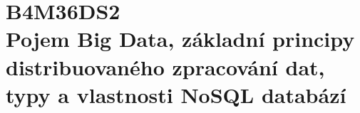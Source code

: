 \chapter[Databáze 2]{B4M36DS2 \\[1ex]\Large{Pojem Big Data, základní principy distribuovaného zpracování dat, typy a vlastnosti NoSQL databází}}
